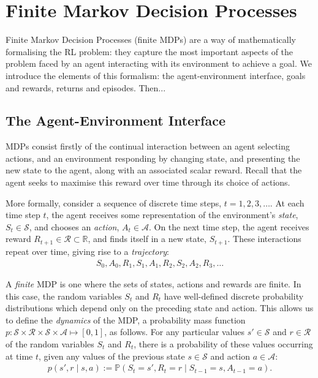 \documentclass[11pt, a4paper, bibliography=totoc]{report}
\newcommand{\reals}{\mathbb{R}}
\renewcommand{\P}[1]{\mathbb{P}\left( #1 \right) }
\begin{document}
\section{Finite Markov Decision Processes}
Finite Markov Decision Processes (finite MDPs) are a way of mathematically formalising the RL problem: they capture the most important aspects of the problem faced by an agent interacting with its environment to achieve a goal. We introduce the elements of this formalism: the agent-environment interface, goals and rewards, returns and episodes. Then...

\subsection{The Agent-Environment Interface}
MDPs consist firstly of the continual interaction between an agent selecting actions, and an environment responding by changing state, and presenting the new state to the agent, along with an associated scalar reward. Recall that the agent seeks to maximise this reward over time through its choice of actions.

More formally, consider a sequence of discrete time steps, $t = 1,2,3, \dots$. At each time step $t$, the agent receives some representation of the environment's \textit{state}, $ S_t \in \mathcal{S} $, and chooses an \textit{action}, $ A_t \in \mathcal{A} $. On the next time step, the agent receives reward $ R_{t+1} \in \mathcal{R} \subset \reals $, and finds itself in a new state, $ S_{t+1} $. These interactions repeat over time, giving rise to a \textit{trajectory}:
\begin{align*}
S_0, A_0, R_1, S_1, A_1, R_2, S_2, A_2, R_3, \dots
\end{align*}

A \textit{finite} MDP is one where the sets of states, actions and rewards are finite. In this case, the random variables $ S_t $ and $ R_t $ have well-defined discrete probability distributions which depend only on the preceding state and action. This allows us to define the \textit{dynamics} of the MDP, a probability mass function $ p : \mathcal{S} \times \mathcal{R} \times \mathcal{S} \times \mathcal{A} \mapsto [0,1] $, as follows. For any particular values $ s' \in \mathcal{S} $ and $ r \in \mathcal{R} $ of the random variables $ S_t $ and $ R_t $, there is a probability of these values occurring at time $ t $, given any values of the previous state $ s \in \mathcal{S} $ and action $ a \in \mathcal{A} $:
\begin{align*}
p(s', r \mid s, a) := \P{S_t = s', R_t = r \mid S_{t-1} = s , A_{t-1} = a }.
\end{align*}
\end{document}
